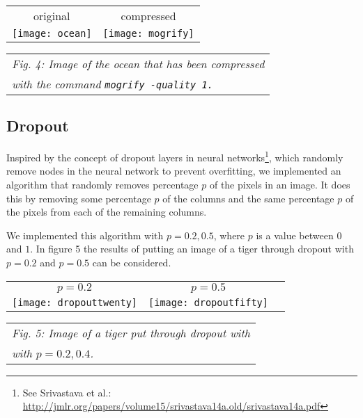 \documentclass[letterpaper, 10 pt, conference]{ieeeconf}  %
\begin{document}
\vspace*{3mm}
\begin{tabular}{c c}
	original & compressed \\
	\texttt{[image: ocean]} &
		\texttt{[image: mogrify]} \\
\end{tabular}
\vspace*{3mm}
\begin{tabular}{l}
    {\it \hspace*{4mm} Fig. 4: Image of the ocean that has been compressed} \\
    {\it \hspace*{4mm} with the command {\tt mogrify -quality 1.}} \\
\end{tabular}


\subsection{Dropout}
Inspired by the concept of dropout layers in neural networks\footnote{See Srivastava et al.: \url{http://jmlr.org/papers/volume15/srivastava14a.old/srivastava14a.pdf}},
which randomly remove nodes in the neural network
to prevent overfitting, we implemented an algorithm
that randomly removes percentage $p$ of the pixels
in an image. It does this by removing
some percentage $p$ of the columns and the same percentage $p$ of the pixels
from each of the remaining columns.

We implemented this algorithm with $p=0.2,0.5$, where $p$ is a value between $0$ and $1$.
In figure 5 the results of putting an image of a tiger through dropout
with $p=0.2$ and $p=0.5$ can be considered.

\vspace*{3mm}
\begin{tabular}{c c c}
	$p=0.2$ & $p=0.5$ \\
	\texttt{[image: dropouttwenty]} &
		\texttt{[image: dropoutfifty]} \\
\end{tabular}
\begin{tabular}{l}
    {\it \hspace*{4mm} Fig. 5: Image of a tiger put through dropout with} \\
    {\it \hspace*{4mm} with $p=0.2, 0.4$.} \\
\end{tabular}
\end{document}
